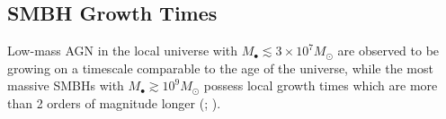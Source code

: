 \documentclass[usenatbib,fleqn]{mn2e}
\begin{document}
  


\subsection{SMBH Growth Times }
\label{sec:growth}

Low-mass AGN in the local universe with $M_{\bullet} \lesssim 3\times
10^{7}M_{\odot}$ are observed to be growing on a timescale comparable
to the age of the universe, while the most massive SMBHs with
$M_{\bullet} \gtrsim 10^{9}M_{\odot}$ possess local growth times which
are more than 2 orders of magnitude longer (\citealt{Heckman+04};
\citealt{Kauffmann&Heckman09}).
\end{document}
